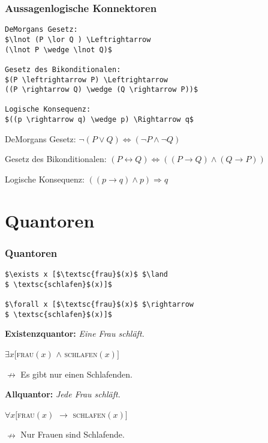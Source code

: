 \begin{frame}[fragile]
\frametitle{Aussagenlogische Konnektoren}

{\small
\begin{lstlisting}
DeMorgans Gesetz:
$\lnot (P \lor Q ) \Leftrightarrow 
(\lnot P \wedge \lnot Q)$

Gesetz des Bikonditionalen:
$(P \leftrightarrow P) \Leftrightarrow 
((P \rightarrow Q) \wedge (Q \rightarrow P))$

Logische Konsequenz:
$((p \rightarrow q) \wedge p) \Rightarrow q$
\end{lstlisting}
}

\pause 

\ea DeMorgans Gesetz: 
$\lnot (P \lor Q ) \Leftrightarrow 
(\lnot P \wedge \lnot Q) $

\ex Gesetz des Bikonditionalen: 
$(P \leftrightarrow Q) \Leftrightarrow 
((P \rightarrow Q) \wedge (Q \rightarrow P))$

\ex Logische Konsequenz: 
$((p \rightarrow q) \wedge p) \Rightarrow q$

\z 

\end{frame}


\section{Quantoren}

\begin{frame}[fragile]
\frametitle{Quantoren}

{\small
\begin{lstlisting}
$\exists x [$\textsc{frau}$(x)$ $\land
$ \textsc{schlafen}$(x)]$

$\forall x [$\textsc{frau}$(x)$ $\rightarrow
$ \textsc{schlafen}$(x)]$
\end{lstlisting}
}


\pause 


\ea \textbf{Existenzquantor:} \emph{Eine Frau schläft.}

\alert{$\exists x [$\textsc{frau}$(x)$ $\land$ \textsc{schlafen}$(x)]$ }


$\nrightarrow$ Es gibt nur einen Schlafenden.	 


\pause 


\ex \textbf{Allquantor:} \emph{Jede Frau schläft.}

\alert{$\forall x [$\textsc{frau}$(x)$ $\rightarrow$ \textsc{schlafen}$(x)]$}


$\nrightarrow$ Nur Frauen sind Schlafende. 
\z 

\end{frame}


